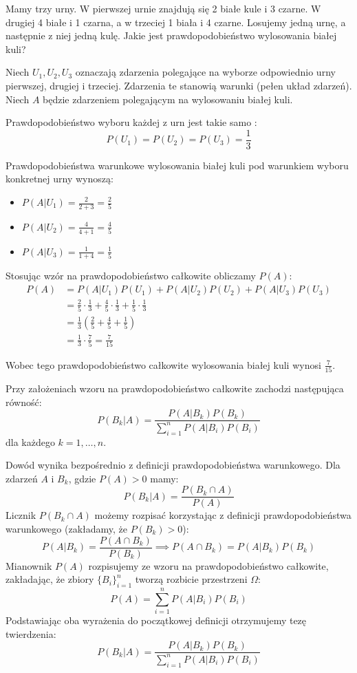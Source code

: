 \documentclass[final,a4paper,openany,12pt]{mwbk}
\begin{document}
\begin{Prz}
Mamy trzy urny. W pierwszej urnie znajdują się 2 białe kule i 3 czarne. W drugiej 4 białe i 1 czarna, a w trzeciej 1 biała i 4 czarne. Losujemy jedną urnę, a następnie z niej jedną kulę. Jakie jest prawdopodobieństwo wylosowania białej kuli?

Niech $U_1, U_2, U_3$ oznaczają zdarzenia polegające na wyborze odpowiednio urny pierwszej, drugiej i trzeciej. Zdarzenia te stanowią warunki (pełen układ zdarzeń). Niech $A$ będzie zdarzeniem polegającym na wylosowaniu białej kuli.

Prawdopodobieństwo wyboru każdej z urn jest takie samo :
\[ P(U_1) = P(U_2) = P(U_3) = \frac{1}{3} \]

Prawdopodobieństwa warunkowe wylosowania białej kuli pod warunkiem wyboru konkretnej urny wynoszą:
\begin{itemize}
    \item $P(A|U_1) = \frac{2}{2+3} = \frac{2}{5}$
    \item $P(A|U_2) = \frac{4}{4+1} = \frac{4}{5}$
    \item $P(A|U_3) = \frac{1}{1+4} = \frac{1}{5}$
\end{itemize}

Stosując wzór na prawdopodobieństwo całkowite obliczamy $P(A)$:
\begin{align*}
P(A) &= P(A|U_1)P(U_1) + P(A|U_2)P(U_2) + P(A|U_3)P(U_3) \\
&= \frac{2}{5} \cdot \frac{1}{3} + \frac{4}{5} \cdot \frac{1}{3} + \frac{1}{5} \cdot \frac{1}{3} \\
&= \frac{1}{3} \left( \frac{2}{5} + \frac{4}{5} + \frac{1}{5} \right) \\
&= \frac{1}{3} \cdot \frac{7}{5} = \frac{7}{15}
\end{align*}

Wobec tego prawdopodobieństwo całkowite wylosowania białej kuli wynosi $\frac{7}{15}$.
\end{Prz}

\begin{Tw}
Przy założeniach wzoru na prawdopodobieństwo całkowite zachodzi następująca równość:
\[
P(B_k|A) = \frac{P(A|B_k)P(B_k)}{\sum_{i=1}^{n} P(A|B_i)P(B_i)}
\]
dla każdego $k=1, \dots, n$.
\end{Tw}

\begin{Dow}
 Dowód wynika bezpośrednio z definicji prawdopodobieństwa warunkowego. Dla zdarzeń $A$ i $B_k$, gdzie $P(A) > 0$ mamy:
\[
P(B_k|A) = \frac{P(B_k \cap A)}{P(A)}
\]
Licznik $P(B_k \cap A)$ możemy rozpisać korzystając z definicji prawdopodobieństwa warunkowego (zakładamy, że $P(B_k) > 0$):
\[
P(A|B_k) = \frac{P(A \cap B_k)}{P(B_k)} \implies P(A \cap B_k) = P(A|B_k)P(B_k)
\]
Mianownik $P(A)$ rozpisujemy ze wzoru na prawdopodobieństwo całkowite, zakładając, że zbiory $\{B_i\}_{i=1}^n$ tworzą rozbicie przestrzeni $\Omega$:
\[
P(A) = \sum_{i=1}^{n} P(A|B_i)P(B_i)
\]
Podstawiając oba wyrażenia do początkowej definicji otrzymujemy tezę twierdzenia:
\[
P(B_k|A) = \frac{P(A|B_k)P(B_k)}{\sum_{i=1}^{n} P(A|B_i)P(B_i)}
\]   
\end{Dow}
\end{document}
